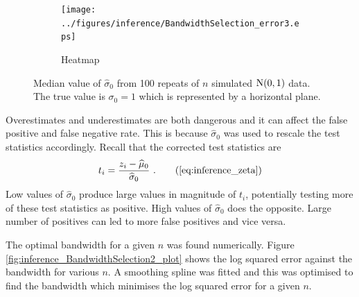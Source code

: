 \begin{figure}
  \centering
    \begin{subfigure}[b]{0.49\textwidth}
        \texttt{[image: ../figures/inference/BandwidthSelection\_error3.eps]}
        \caption{Heatmap}
    \end{subfigure}
    \caption{Median value of $\widehat{\sigma}_0$ from 100 repeats of $n$ simulated $\operatorname{N}(0,1)$ data. The true value is $\sigma_0=1$ which is represented by a horizontal plane.}
    \label{fig:inference_BandwidthSelection_error3}
\end{figure}

Overestimates and underestimates are both dangerous and it can affect the false positive and false negative rate. This is because $\widehat{\sigma}_0$ was used to rescale the test statistics accordingly. Recall that the corrected test statistics are
\begin{equation}
  t_i = \dfrac{
    z_i - \widehat{\mu}_0
  }
  {
    \widehat{\sigma}_0
  }
  \ .
  \tag{\ref{eq:inference_zeta}}
\end{equation}
Low values of $\widehat{\sigma}_0$ produce large values in magnitude of $t_i$, potentially testing more of these test statistics as positive. High values of $\widehat{\sigma}_0$ does the opposite. Large number of positives can led to more false positives and vice versa.

The optimal bandwidth for a given $n$ was found numerically. Figure \ref{fig:inference_BandwidthSelection2_plot} shows the log squared error against the bandwidth for various $n$. A smoothing spline \citep{friedman2001elements} was fitted and this was optimised to find the bandwidth which minimises the log squared error for a given $n$.

